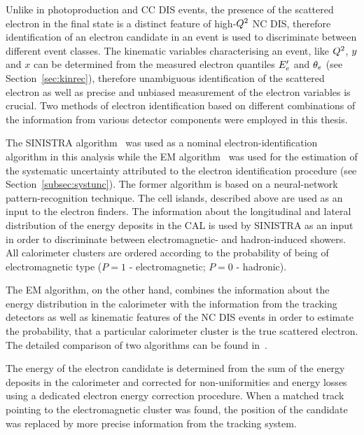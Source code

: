 Unlike in photoproduction and CC DIS events, the presence of the scattered electron in the final state is a distinct feature of high-$\mbox{${Q^2}$}$ NC DIS, therefore identification of an electron candidate in an event is used to discriminate between different event classes. The kinematic variables characterising an event, like $\mbox{${Q^2}$}$, $\mbox{${y}$}$ and $x$ can be determined from the measured electron quantiles $\mbox{$E_e'$}$ and $\mbox{$\theta_e$}$ (see Section~\ref{sec:kinrec}), therefore unambiguous identification of the scattered electron as well as precise and unbiased measurement of the electron variables is crucial. Two methods of electron identification based on different combinations of the information from various detector components were employed in this thesis. 

The SINISTRA algorithm~\cite{nim:a365:508} was used as a nominal electron-identification algorithm in this analysis while the EM algorithm~\cite{epj:c11:427,upub:Straub:url} was used for the estimation of the systematic uncertainty attributed to the electron identification procedure (see Section~\ref{subsec:systunc}). The former algorithm is based on a neural-network pattern-recognition technique. The cell islands, described above are used as an input to the electron finders. The information about the longitudinal and lateral distribution of the energy deposits in the CAL is used by SINISTRA as an input in order to discriminate between electromagnetic- and hadron-induced showers. All calorimeter clusters are ordered according to the probability of being of electromagnetic type ($P=1$ - electromagnetic; $P=0$ - hadronic). 

The EM algorithm, on the other hand, combines the information about the energy distribution in the calorimeter with the information from the tracking detectors as well as kinematic features of the NC DIS events in order to estimate the probability, that a particular calorimeter cluster is the true scattered electron. The detailed comparison of two algorithms can be found in~\cite{upub:schlenstedt:zn9977}.

The energy of the electron candidate is determined from the sum of the energy deposits in the calorimeter and corrected for non-uniformities and energy losses using a dedicated electron energy correction procedure. When a matched track pointing to the electromagnetic cluster was found, the position of the candidate was replaced by more precise information from the tracking system.